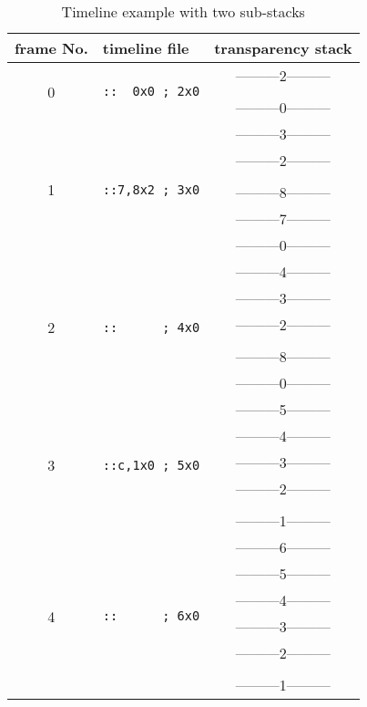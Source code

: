 \documentclass[a4paper]{article}
\begin{document}
\begin{table}[ht]\centering
\caption{Timeline example with two sub-stacks}\label{tab:multi}
\begin{tabular}[t]{c|l|c}\hline
frame No. & timeline file & transparency stack\\\hline\hline
\multirow{3}{*}{0} & \multirow{3}{*}{\tt::\ \ 0x0 ; 2x0} & ---------2---------\\&&{\tiny\dotfill}\\&&---------0---------\\\cline{1-1}\cline{3-3}
\multirow{6}{*}{1} & \multirow{6}{*}{\tt::7,8x2 ; 3x0} & ---------3---------\\&&---------2---------\\&&\tiny\dotfill\\&&---------8---------\\&&---------7---------\\&&---------0---------\\\cline{1-1}\cline{3-3}
\multirow{6}{*}{2} & \multirow{6}{*}{\tt::\ \ \ \ \ \ ; 4x0} & ---------4---------\\&&---------3---------\\&&---------2---------\\&&\tiny\dotfill\\&&---------8---------\\&&---------0---------\\\cline{1-1}\cline{3-3}
\multirow{6}{*}{3} & \multirow{6}{*}{\tt::c,1x0 ; 5x0} & ---------5---------\\&&---------4---------\\&&---------3---------\\&&---------2---------\\&&\tiny\dotfill\\&&---------1---------\\\cline{1-1}\cline{3-3}
\multirow{7}{*}{4} & \multirow{7}{*}{\tt::\ \ \ \ \ \ ; 6x0} & ---------6---------\\&&---------5---------\\&&---------4---------\\&&---------3---------\\&&---------2---------\\&&\tiny\dotfill\\&&---------1---------\\\hline
\end{tabular}
\end{table}
\end{document}
